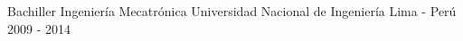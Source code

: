 

\begin{cventries}

  \cventry
    {Bachiller Ingenier\'ia Mecatr\'onica} %
    {Universidad Nacional de Ingenier\'ia} %
    {Lima - Per\'u} %
    {2009 - 2014} %
    {}

\end{cventries}
